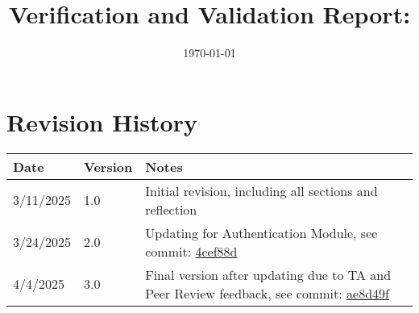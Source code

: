 \documentclass[12pt, titlepage]{article}
\begin{document}
\title{Verification and Validation Report: \progname} 
\author{\authname}
\date{\today}
	
\maketitle


\section{Revision History}

\begin{tabularx}{\textwidth}{p{3cm}p{2cm}X}
\toprule {\bf Date} & {\bf Version} & {\bf Notes}\\
\midrule
3/11/2025 & 1.0 & Initial revision, including all sections and reflection\\
3/24/2025 & 2.0 & Updating for Authentication Module, see commit: \href{https://github.com/ausbennett/mes-finance-platform/commit/4cef88de4d7c2a664fa8e2395804251c0a6baeb4}{4cef88d}\\
4/4/2025 & 3.0 & Final version after updating due to TA and Peer Review feedback, see commit: \href{https://github.com/ausbennett/mes-finance-platform/commit/ae8d49ff428d03722ffde029f4580c35bd223fed}{ae8d49f}
\bottomrule
\end{tabularx}

~\newpage




\newpage

\tableofcontents

\listoftables %

\newpage

\end{document}
